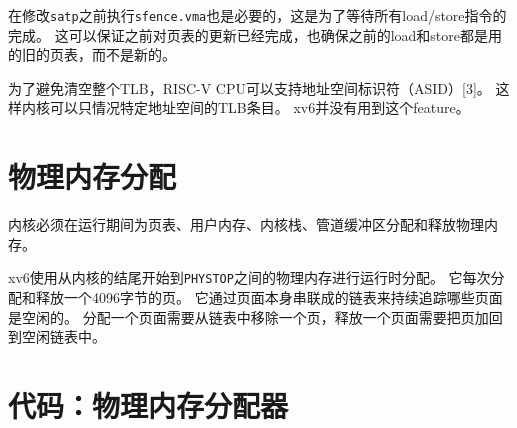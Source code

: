 在修改\texttt{satp}之前执行\texttt{sfence.vma}也是必要的，这是为了等待所有load/store指令的完成。
这可以保证之前对页表的更新已经完成，也确保之前的load和store都是用的旧的页表，而不是新的。

为了避免清空整个TLB，RISC-V CPU可以支持地址空间标识符（ASID）[3]。
这样内核可以只情况特定地址空间的TLB条目。
xv6并没有用到这个feature。

\section{物理内存分配}
内核必须在运行期间为页表、用户内存、内核栈、管道缓冲区分配和释放物理内存。

xv6使用从内核的结尾开始到\texttt{PHYSTOP}之间的物理内存进行运行时分配。
它每次分配和释放一个4096字节的页。
它通过页面本身串联成的链表来持续追踪哪些页面是空闲的。
分配一个页面需要从链表中移除一个页，释放一个页面需要把页加回到空闲链表中。

\section{代码：物理内存分配器}
